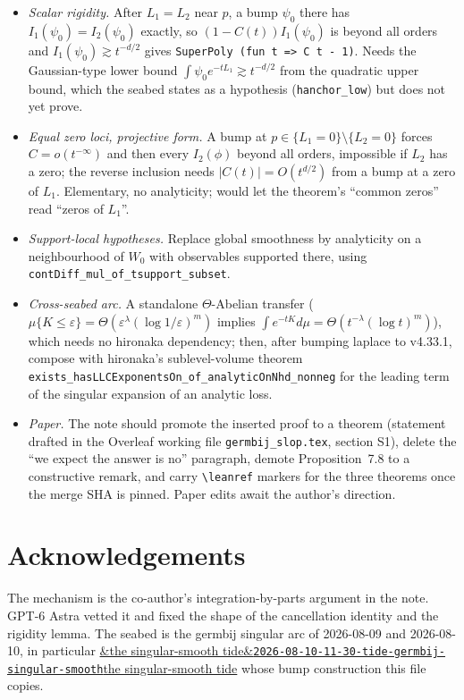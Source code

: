 \documentclass[11pt]{article}
\newcommand{\code}[1]{\texttt{#1}}
\newcommand{\tideref}[2][]{\href{https://therisensea.org/tides/#2/}{\ifx&#1&\texttt{#2}\else#1\fi}}
\begin{document}
\begin{itemize}
\item \emph{Scalar rigidity.} After $L_1 = L_2$ near $p$, a bump
$\psi_0$ there has $I_1(\psi_0) = I_2(\psi_0)$ exactly, so $(1 - C(t))
I_1(\psi_0)$ is beyond all orders and $I_1(\psi_0) \gtrsim t^{-d/2}$
gives \code{SuperPoly (fun t => C t - 1)}. Needs the Gaussian-type lower
bound $\int\psi_0 e^{-tL_1} \gtrsim t^{-d/2}$ from the quadratic upper
bound, which the seabed states as a hypothesis
(\code{hanchor\_low}) but does not yet prove.
\item \emph{Equal zero loci, projective form.} A bump at $p \in \{L_1 =
0\} \setminus \{L_2 = 0\}$ forces $C = o(t^{-\infty})$ and then every
$I_2(\phi)$ beyond all orders, impossible if $L_2$ has a zero; the
reverse inclusion needs $|C(t)| = O(t^{d/2})$ from a bump at a zero of
$L_1$. Elementary, no analyticity; would let the theorem's ``common
zeros'' read ``zeros of $L_1$''.
\item \emph{Support-local hypotheses.} Replace global smoothness by
analyticity on a neighbourhood of $W_0$ with observables supported
there, using \code{contDiff\_mul\_of\_tsupport\_subset}.
\item \emph{Cross-seabed arc.} A standalone $\Theta$-Abelian transfer
($\mu\{K \le \varepsilon\} = \Theta(\varepsilon^\lambda (\log 1/\varepsilon)^{m})$
implies $\int e^{-tK} d\mu = \Theta(t^{-\lambda}(\log t)^m)$), which
needs no hironaka dependency; then, after bumping laplace to v4.33.1,
compose with hironaka's sublevel-volume theorem
\code{exists\_hasLLCExponentsOn\_of\_analyticOnNhd\_nonneg} for the leading term of the singular expansion of an analytic loss.
\item \emph{Paper.} The note should promote the inserted proof to a
theorem (statement drafted in the Overleaf working file
\code{germbij\_slop.tex}, section S1), delete the ``we expect the answer
is no'' paragraph, demote Proposition~7.8 to a constructive remark, and
carry \code{\textbackslash leanref} markers for the three theorems once
the merge SHA is pinned. Paper edits await the author's direction.
\end{itemize}

\section*{Acknowledgements}

The mechanism is the co-author's integration-by-parts argument in the
note. GPT-6 Astra vetted it and fixed the shape of the cancellation
identity and the rigidity lemma. The seabed is the germbij singular arc
of 2026-08-09 and 2026-08-10, in particular
\tideref[the singular-smooth tide]{2026-08-10-11-30-tide-germbij-singular-smooth}
whose bump construction this file copies.
\end{document}
